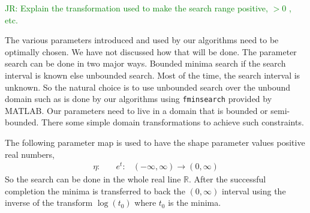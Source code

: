 \documentclass{iitthesis}          %
\newcommand{\reals}{\mathbb{R}}
\newcommand{\rlambda}{\mathring{\lambda}}
\newcommand{\MLE}{\textup{MLE}}
\newcommand{\GCV}{\textup{GCV}}
\newcommand{\err}{\textup{err}}
\newcommand{\code}[1]{\texttt{#1}}
\def\abs#1{\ensuremath{\left \lvert #1 \right \rvert}}
\newcommand{\JRNote}[1]{{\textcolor{green}{JR: #1}}}
\begin{document}

\JRNote{Explain the transformation used to make the search range positive, $> 0$ , etc.}

The various parameters introduced and used by our algorithms need to be optimally chosen. We have not discussed how that will be done. 
The parameter search can be done in two major ways. 
Bounded minima search if the search interval is known else unbounded search.  Most of the time, the search interval is unknown. So the natural choice is to use unbounded search over the unbound domain such as is done by our algorithms using \code{fminsearch} provided by MATLAB.
Our parameters need to live in a domain that is bounded or semi-bounded. 
There some simple domain transformations to achieve such constraints.

The following parameter map is used to have the shape parameter values positive real numbers,
\begin{align*}
\eta: & \quad e^{t}: & (-\infty, \infty) \to (0, \infty)
\end{align*}
So the search can be done in the whole real line $\reals$. After the successful completion the minima is transferred to back the $(0, \infty)$ interval using the inverse of the transform $\log(t_0 )$ where $t_0$ is the minima.
\end{document}
